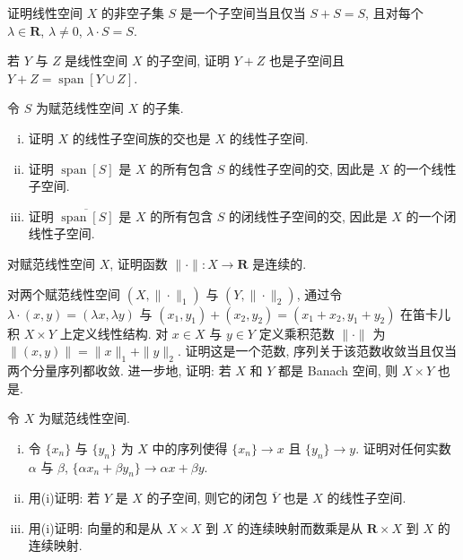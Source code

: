\documentclass[../../main.tex]{subfiles}
\begin{document}
\begin{exercise}\label{exercise:ch13-01}
证明线性空间 $X$ 的非空子集 $S$ 是一个子空间当且仅当 $S+S=S$, 且对每个 $\lambda\in\mathbf{R}$, $\lambda\neq 0$, $\lambda\cdot S=S$.
\end{exercise}

\begin{exercise}\label{exercise:ch13-02}
若 $Y$ 与 $Z$ 是线性空间 $X$ 的子空间, 证明 $Y+Z$ 也是子空间且 $Y+Z=\operatorname{span}[Y\cup Z]$.
\end{exercise}

\begin{exercise}\label{exercise:ch13-03}
令 $S$ 为赋范线性空间 $X$ 的子集.
\begin{enumerate}[(i)]
\item 证明 $X$ 的线性子空间族的交也是 $X$ 的线性子空间.
\item 证明 $\operatorname{span}[S]$ 是 $X$ 的所有包含 $S$ 的线性子空间的交, 因此是 $X$ 的一个线性子空间.
\item 证明 $\overline{\operatorname{span}[S]}$ 是 $X$ 的所有包含 $S$ 的闭线性子空间的交, 因此是 $X$ 的一个闭线性子空间.
\end{enumerate}
\end{exercise}

\begin{exercise}\label{exercise:ch13-04}
对赋范线性空间 $X$, 证明函数 $\|\cdot\|:X\to\mathbf{R}$ 是连续的.
\end{exercise}

\begin{exercise}\label{exercise:ch13-05}
对两个赋范线性空间 $(X,\|\cdot\|_{1})$ 与 $(Y,\|\cdot\|_{2})$, 通过令 $\lambda\cdot(x,y)=(\lambda x,\lambda y)$ 与 $(x_{1},y_{1})+(x_{2},y_{2})=(x_{1}+x_{2},y_{1}+y_{2})$ 在笛卡儿积 $X\times Y$ 上定义线性结构. 对 $x\in X$ 与 $y\in Y$ 定义乘积范数 $\|\cdot\|$ 为 $\|(x,y)\|=\|x\|_{1}+\|y\|_{2}$. 证明这是一个范数, 序列关于该范数收敛当且仅当两个分量序列都收敛. 进一步地, 证明: 若 $X$ 和 $Y$ 都是 Banach 空间, 则 $X\times Y$ 也是.
\end{exercise}

\begin{exercise}\label{exercise:ch13-06}
令 $X$ 为赋范线性空间.
\begin{enumerate}[(i)]
\item 令 $\{x_{n}\}$ 与 $\{y_{n}\}$ 为 $X$ 中的序列使得 $\{x_{n}\}\to x$ 且 $\{y_{n}\}\to y$. 证明对任何实数 $\alpha$ 与 $\beta$, $\{\alpha x_{n}+\beta y_{n}\}\to\alpha x+\beta y$.
\item 用(i)证明: 若 $Y$ 是 $X$ 的子空间, 则它的闭包 $\overline{Y}$ 也是 $X$ 的线性子空间.
\item 用(i)证明: 向量的和是从 $X\times X$ 到 $X$ 的连续映射而数乘是从 $\mathbf{R}\times X$ 到 $X$ 的连续映射.
\end{enumerate}
\end{exercise}
\end{document}
